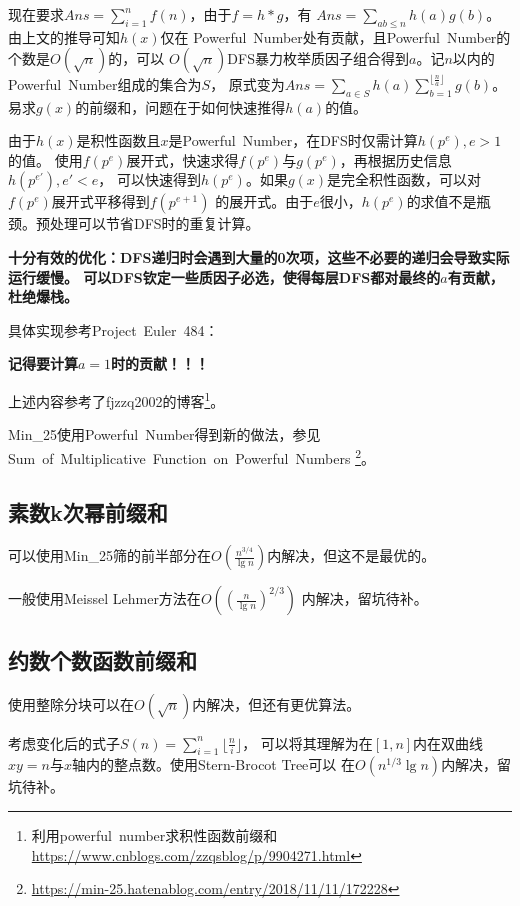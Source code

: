 现在要求$\displaystyle Ans=\sum_{i=1}^n{f(n)}$，由于$f=h*g$，有
$\displaystyle Ans=\sum_{ab\leq n}{h(a)g(b)}$。由上文的推导可知$h(x)$仅在
Powerful~Number处有贡献，且Powerful~Number的个数是$O(\sqrt{n})$的，可以
$O(\sqrt{n})$DFS暴力枚举质因子组合得到$a$。记$n$以内的Powerful~Number组成的集合为$S$，
原式变为$\displaystyle Ans=\sum_{a\in S}{h(a)\sum_{b=1}^{\lfloor \frac{n}{a} \rfloor}{g(b)}}$。
易求$g(x)$的前缀和，问题在于如何快速推得$h(a)$的值。

由于$h(x)$是积性函数且$x$是Powerful~Number，在DFS时仅需计算$h(p^e),e>1$的值。
使用$f(p^e)$展开式，快速求得$f(p^e)$与$g(p^e)$，再根据历史信息$h(p^{e'}),e'<e$，
可以快速得到$h(p^e)$。如果$g(x)$是完全积性函数，可以对$f(p^e)$展开式平移得到$f(p^{e+1})$
的展开式。由于$e$很小，$h(p^e)$的求值不是瓶颈。预处理可以节省DFS时的重复计算。

{\bfseries 十分有效的优化：DFS递归时会遇到大量的0次项，这些不必要的递归会导致实际运行缓慢。
可以DFS钦定一些质因子必选，使得每层DFS都对最终的$a$有贡献，杜绝爆栈。}

具体实现参考Project~Euler~484：


{\bfseries 记得要计算$a=1$时的贡献！！！}

上述内容参考了fjzzq2002的博客\footnote{
利用powerful~number求积性函数前缀和
    \url{https://www.cnblogs.com/zzqsblog/p/9904271.html}
}。

Min\_25使用Powerful~Number得到新的做法，参见
Sum~of~Multiplicative~Function~on~Powerful~Numbers
\footnote{\url{https://min-25.hatenablog.com/entry/2018/11/11/172228}}。
\subsection{素数k次幂前缀和}
可以使用Min\_25筛的前半部分在$O(\frac{n^{3/4}}{\lg n})$内解决，但这不是最优的。

一般使用Meissel Lehmer方法在$O\left(\left(\frac{n}{\lg n}\right)^{2/3}\right)$
内解决，留坑待补。
\subsection{约数个数函数前缀和}
使用整除分块可以在$O(\sqrt{n})$内解决，但还有更优算法。

考虑变化后的式子$S(n)=\displaystyle \sum_{i=1}^n{\lfloor\frac{n}{i}\rfloor}$，
可以将其理解为在$[1,n]$内在双曲线$xy=n$与$x$轴内的整点数。使用Stern-Brocot Tree可以
在$O(n^{1/3}\lg n)$内解决，留坑待补。

